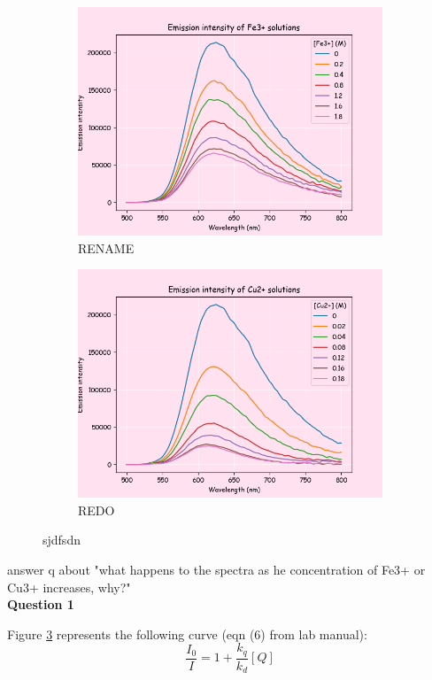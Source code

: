\begin{figure}[H]
     \centering
     \begin{subfigure}[b]{0.49\textwidth}
         \centering
         \includegraphics[width=\textwidth]{part1_fe.png}
         \caption{RENAME}
         \label{fig:part1_fe}
     \end{subfigure}
     \hfill
     \begin{subfigure}[b]{0.49\textwidth}
         \centering
         \includegraphics[width=\textwidth]{part1_cu.png}
         \caption{REDO}
         \label{fig:part1_Cu}
     \end{subfigure}
     \caption{sjdfsdn}
     \label{fig:stern_volmers}
\end{figure}
answer q about "what happens to the spectra as he concentration of Fe3+ or Cu3+ increases, why?"
\\
\textbf{Question 1}
\par Figure \ref{fig:stern_volmers} represents the following curve (eqn (6) from lab manual\autocite{lab_manual}):
\begin{equation*}
    \frac{I_0}{I} = 1 + \frac{k_q}{k_d}[Q]
\end{equation*}

